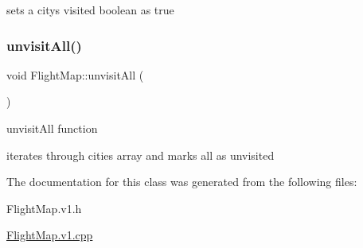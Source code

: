 sets a city\textquotesingle{}s visited boolean as true \hypertarget{class_flight_map_a97cfb0e508046ffb802be03496f88fc4}{}\label{class_flight_map_a97cfb0e508046ffb802be03496f88fc4} 
\subsubsection{\texorpdfstring{unvisit\+All()}{unvisitAll()}}
{\footnotesize\ttfamily void Flight\+Map\+::unvisit\+All (\begin{DoxyParamCaption}{ }\end{DoxyParamCaption})}



unvisit\+All function 

iterates through cities array and marks all as unvisited 

The documentation for this class was generated from the following files\+:\begin{DoxyCompactItemize}
\item 
Flight\+Map.\+v1.\+h\item 
\hyperlink{_flight_map_8v1_8cpp}{Flight\+Map.\+v1.\+cpp}\end{DoxyCompactItemize}
